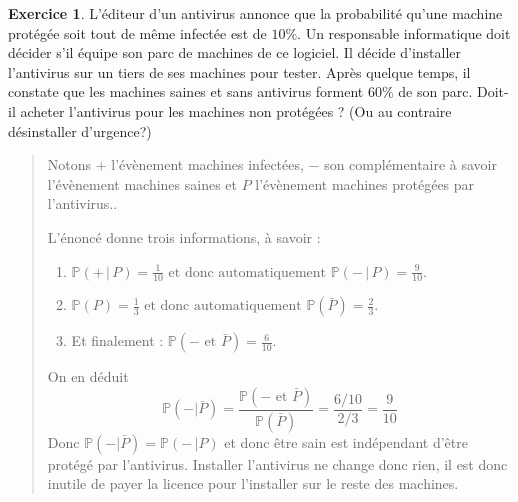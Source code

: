 \documentclass[11pt]{article}
\renewcommand{\P}{\mathbb P}
\theoremstyle{definition}
\newtheorem{exo}{Exercice}
\newenvironment{solution}{\begin{quote}\color{teal}}{\end{quote}}
\begin{document}
\begin{exo}
L'éditeur d'un antivirus annonce que la probabilité qu'une machine protégée soit tout de même infectée est de $10\%$. Un responsable informatique doit décider s'il équipe son parc de machines de ce logiciel.  Il décide d'installer l'antivirus sur un tiers de ses machines pour tester. 
Après quelque temps, il constate que les machines saines et sans antivirus forment $60\%$ de son parc. 
Doit-il acheter l'antivirus pour les machines non protégées ? (Ou au contraire désinstaller d'urgence?)
\begin{solution}
Notons \og $+$\fg{} l'évènement \og machines infectées\fg, \og $-$\fg{} son complémentaire à savoir  l'évènement \og machines saines\fg{} et \og $P$\fg{} l'évènement \og machines protégées par l'antivirus.\fg.

L'énoncé donne  trois informations, à savoir :
\begin{enumerate}
\item $\P(+\,|\,P)=\frac{1}{10} \text{ et donc automatiquement } \P(-\,|\,P)=\frac{9}{10}$.
\item $\P(P)=\frac{1}{3}\text{ et donc automatiquement } \P(\bar P)=\frac{2}{3}$.
\item Et finalement : $\P(- \text{ et }  \bar P) = \frac{6}{10}$.
\end{enumerate}

On en déduit
\[ \P(-\vert \bar P) = \frac{\P(- \text{ et }  \bar P)}{\P(\bar P)}
=\frac{6/10}{2/3}=\frac{9}{10}
\]
Donc $\P(-\vert \bar P)=\P(-\,\vert P)$ et donc être sain est indépendant d'être protégé par l'antivirus. Installer l'antivirus ne change donc rien, il est donc inutile de payer la licence pour l'installer sur le reste des machines.
\end{solution}
\end{exo}
\end{document}
